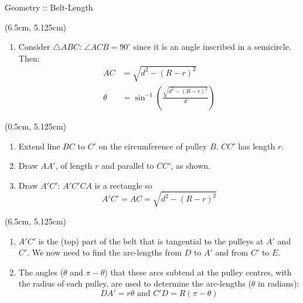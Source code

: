 \begin{frame}{Geometry :: Belt-Length}
\begin{textblock*}{0.475\textwidth}
    \end{textblock*}

    \begin{textblock*}{0.475\textwidth}(6.5cm, 5.125cm)
        \begin{enumerate}
            \resume
            \item<5-8 | alert@5> Consider $\triangle ABC$: $\angle ACB=90^\circ$ since it is an angle inscribed in a semicircle. Then:
                \begin{align*}
                    AC     & = \sqrt{d^2-(R-r)^2}                                 \\
                    \theta & = \sin^{-1}\left(\frac{\sqrt{d^2-(R-r)^2}}{d}\right)
                \end{align*}
                \suspend
        \end{enumerate}
    \end{textblock*}




    \begin{textblock*}{0.475\textwidth}(0.5cm, 5.125cm)

        \begin{enumerate}
            \resume
            \item<6-10 | alert@6> Extend line $BC$ to $C'$ on the circumference of pulley $B$. $CC'$ has length $r$.
            \item<7-10 | alert@7> Draw $AA'$, of length $r$ and parallel to $CC'$, as shown.
            \item<8-10 | alert@8> Draw $A'\!C'$: $A'\!C'\!C\!A$ is a rectangle so
                \[ A'\!C' = AC = \sqrt{d^2-(R-r)^2} \]
                \suspend
        \end{enumerate}
    \end{textblock*}

    \begin{textblock*}{0.475\textwidth}(6.5cm, 5.125cm)
        \begin{enumerate}
            \resume
            \item<9-11 | alert@9> $A'\!C'$ is the (top) part of the belt that is tangential to the pulleys at $A'$ and $C'$. We now need to find the arc-lengths from $D$ to $A'$ and from $C'$ to $E$.
                \item<10-11 | alert@10>The angles ($\theta$ and $\pi\!-\!\theta$) that these arcs subtend at the pulley centres, with  the radius of each pulley, are used to determine the arc-lengths ($\theta$ in radians):
                $$ D\!A'=r\theta \text{ and } C'\!D=R(\pi\!-\!\theta) $$
                \suspend
        \end{enumerate}
    \end{textblock*}


\end{frame}
